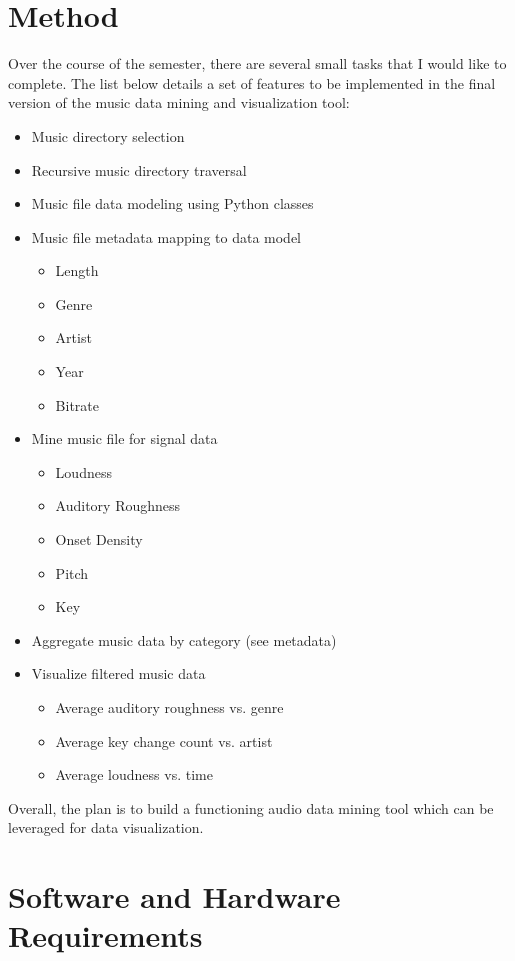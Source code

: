 \documentclass[12pt, a4paper]{article}
\begin{document}
\section*{Method}

Over the course of the semester, there are several small tasks that I would like
to complete. The list below details a set of features to be implemented in the
final version of the music data mining and visualization tool:

\begin{itemize}
  \item Music directory selection
  \item Recursive music directory traversal
  \item Music file data modeling using Python classes
  \item Music file metadata mapping to data model
  \begin{itemize}
    \item Length
    \item Genre
    \item Artist
    \item Year
    \item Bitrate
  \end{itemize}
  \item Mine music file for signal data
  \begin{itemize}
    \item Loudness
    \item Auditory Roughness
    \item Onset Density
    \item Pitch
    \item Key
  \end{itemize}
  \item Aggregate music data by category (see metadata)
  \item Visualize filtered music data
  \begin{itemize}
    \item Average auditory roughness vs. genre
    \item Average key change count vs. artist
    \item Average loudness vs. time
  \end{itemize}
\end{itemize}

Overall, the plan is to build a functioning audio data mining tool which can be
leveraged for data visualization. 

\section*{Software and Hardware Requirements}
\end{document}
